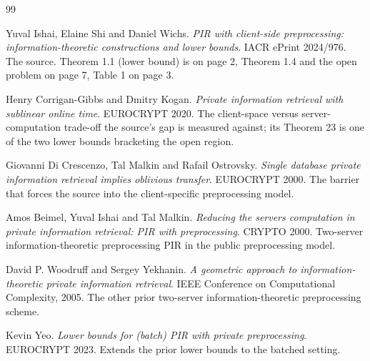 \documentclass{conjura-conjecture}
\begin{document}
\begin{conjurabibliography}{99}

Yuval Ishai, Elaine Shi and Daniel Wichs.
\emph{PIR with client-side preprocessing: information-theoretic
constructions and lower bounds}.
IACR ePrint 2024/976.
The source. Theorem 1.1 (lower bound) is on page 2, Theorem 1.4 and the
open problem on page 7, Table 1 on page 3.

Henry Corrigan-Gibbs and Dmitry Kogan.
\emph{Private information retrieval with sublinear online time}.
EUROCRYPT 2020.
The client-space versus server-computation trade-off the source's gap is
measured against; its Theorem 23 is one of the two lower bounds bracketing
the open region.

Giovanni Di Crescenzo, Tal Malkin and Rafail Ostrovsky.
\emph{Single database private information retrieval implies oblivious
transfer}.
EUROCRYPT 2000.
The barrier that forces the source into the client-specific
preprocessing model.

Amos Beimel, Yuval Ishai and Tal Malkin.
\emph{Reducing the servers computation in private information retrieval:
PIR with preprocessing}.
CRYPTO 2000.
Two-server information-theoretic preprocessing PIR in the public
preprocessing model.

David P. Woodruff and Sergey Yekhanin.
\emph{A geometric approach to information-theoretic private information
retrieval}.
IEEE Conference on Computational Complexity, 2005.
The other prior two-server information-theoretic preprocessing scheme.

Kevin Yeo.
\emph{Lower bounds for (batch) PIR with private preprocessing}.
EUROCRYPT 2023.
Extends the prior lower bounds to the batched setting.

\end{conjurabibliography}
\end{document}
